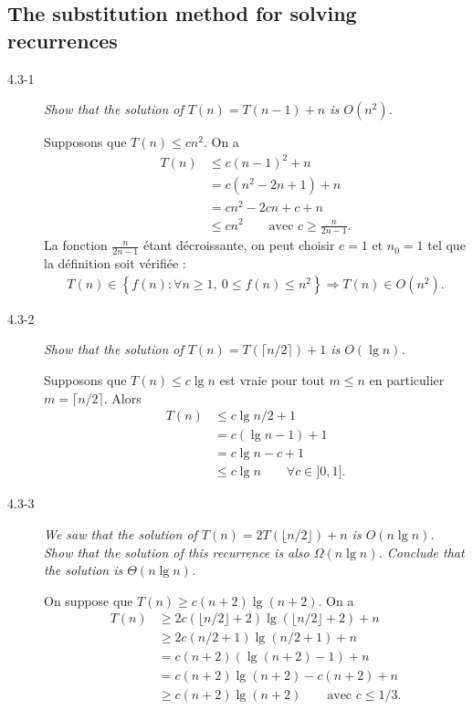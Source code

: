 \subsection{The substitution method for solving recurrences}

\begin{description}
  \item[4.3-1] {\itshape Show that the solution of $T(n) = T(n-1) + n$ is $O(n^2)$.}

    \begin{ex}
      Supposons que $T(n) \le cn^2$. On a 
      \begin{align*}
        T(n) &\le c(n-1)^2 + n\\
        &= c(n^2-2n+1)+n\\
        &= cn^2 - 2cn + c + n\\
        &\le cn^2 \quad\quad \textrm{avec }c \ge \frac{n}{2n-1}.
      \end{align*}
      La fonction $\frac{n}{2n-1}$ \'etant d\'ecroissante, on peut choisir $c = 1$ et $n_0 = 1$ tel que la d\'efinition soit v\'erifi\'ee : 
      \begin{align*}
        T(n) \in \left\{ f(n) : \forall n \ge 1,~ 0 \le f(n) \le n^2 \right\}  \Longrightarrow T(n) \in O(n^2).
      \end{align*}

    \end{ex}

  \item[4.3-2] {\itshape Show that the solution of $T(n) = T(\lceil n/2 \rceil)+1$ is $O(\lg n)$.}

    \begin{ex}
      Supposons que $T(n) \le c\lg n$ est vraie pour tout $m \le n$ en particulier ${m = \lceil n/2 \rceil}$. Alors 
      \begin{align*}
        T(n) &\le c\lg n/2 + 1\\
        &= c(\lg n - 1) + 1\\
        &= c \lg n -c + 1\\
        &\le c\lg n \quad\quad \forall c \in ]0, 1].
      \end{align*}
    \end{ex}

  \item[4.3-3] {\itshape We saw that the solution of $T(n) = 2T(\lfloor n/2 \rfloor) + n$ is $O(n \lg n)$. Show that the solution of this recurrence is also $\Omega(n \lg n)$. Conclude that the solution is $\Theta(n \lg n)$.}
  \begin{ex} %
    On suppose que $T(n) \ge c(n+2)\lg(n+2)$. On a 
    \begin{align*}
      T(n) &\ge 2c(\lfloor n/2\rfloor+2)\lg(\lfloor n/2\rfloor+2) + n\\
        &\ge 2c(n/2+1)\lg(n/2+1)+n \\
        &= c(n+2)(\lg(n+2)-1)+n\\
        &= c(n+2)\lg(n+2)-c(n+2)+n\\
        &\ge c(n+2)\lg(n+2) \quad\quad \textrm{avec } c \le 1/3. 
    \end{align*}


\end{ex}
\end{description}
